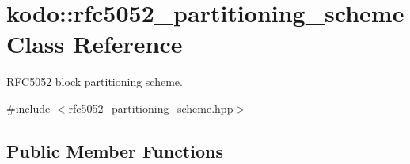 \hypertarget{classkodo_1_1rfc5052__partitioning__scheme}{\section{kodo\-:\-:rfc5052\-\_\-partitioning\-\_\-scheme Class Reference}
\label{classkodo_1_1rfc5052__partitioning__scheme}
}


R\-F\-C5052 block partitioning scheme.  




{\ttfamily \#include $<$rfc5052\-\_\-partitioning\-\_\-scheme.\-hpp$>$}

\subsection*{Public Member Functions}
